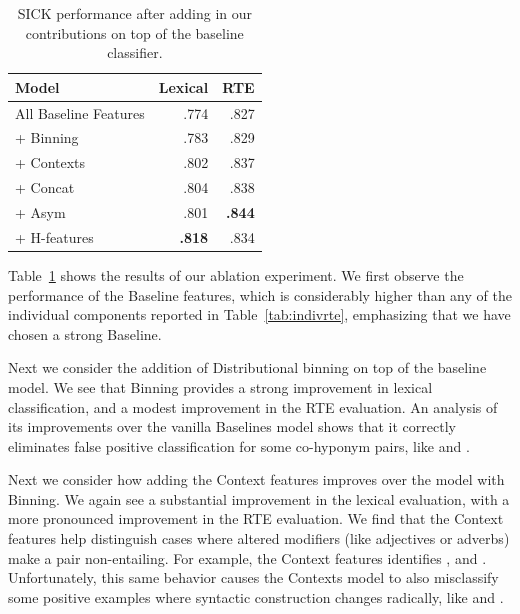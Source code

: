 \begin{table}
  \centering
  \begin{tabular}{|l|rr|}
  \hline
  {\bf Model}                & {\bf Lexical} &     {\bf RTE}  \\
  \hline\hline
  All Baseline Features       &      .774     &        .827   \\
  \hline
  + Binning                   &      .783     &        .829   \\
  \quad + Contexts            &      .802     &        .837   \\
  \quad\quad + Concat         &      .804     &        .838   \\
  \quad\quad + Asym           &      .801     &    {\bf.844}  \\
  \quad\quad + H-features     &  {\bf.818}    &        .834   \\
  \hline
  \end{tabular}
  \caption{SICK performance after adding in our contributions on top of the baseline classifier.}
  \label{tab:contribrte}
\end{table}

Table~\ref{tab:contribrte} shows the results of our ablation experiment. We
first observe the performance of the Baseline features, which is considerably
higher than any of the individual components reported in
Table~\ref{tab:indivrte}, emphasizing that we have chosen a strong Baseline.

Next we consider the addition of Distributional binning on top of the baseline
model. We see that Binning provides a strong improvement in lexical
classification, and a modest improvement in the RTE evaluation. An analysis
of its improvements over the vanilla Baselines model shows that it correctly
eliminates false positive classification for some co-hyponym pairs, like
 and .

Next we consider how adding the Context features improves over the model
with Binning. We again see a substantial improvement in the lexical evaluation,
with a more pronounced improvement in the RTE evaluation. We find that the
Context features help distinguish cases where altered modifiers (like adjectives
or adverbs) make a pair non-entailing.
For example, the Context features identifies , and . Unfortunately, this
same behavior causes the Contexts model to also misclassify
some positive examples where syntactic
construction changes radically, like  and .

